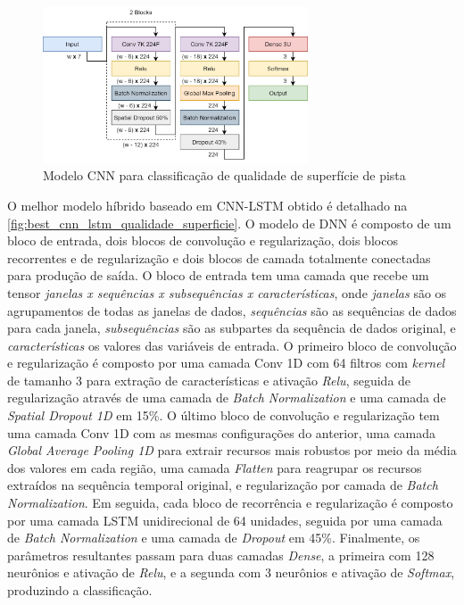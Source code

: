 \begin{figure}[h!]
  \centering
  \caption{Modelo CNN para classificação de qualidade de superfície de pista}
  \label{fig:best_cnn_qualidade_superficie}
  \includegraphics[width=0.7\textwidth]{figuras/fig_48.png}
\end{figure}

O melhor modelo híbrido baseado em CNN-LSTM obtido é detalhado na \autoref{fig:best_cnn_lstm_qualidade_superficie}. O modelo de DNN é composto de um bloco de entrada, dois blocos de convolução e regularização, dois blocos recorrentes e de regularização e dois blocos de camada totalmente conectadas para produção de saída. O bloco de entrada tem uma camada que recebe um tensor \emph{janelas x sequências x subsequências x características}, onde \emph{janelas} são os agrupamentos de todas as janelas de dados, \emph{sequências} são as sequências de dados para cada janela, \emph{subsequências} são as subpartes da sequência de dados original, e \emph{características} os valores das variáveis de entrada. O primeiro bloco de convolução e regularização é composto por uma camada Conv 1D com 64 filtros com \textit{kernel} de tamanho 3 para extração de características e ativação \textit{Relu}, seguida de regularização através de uma camada de \textit{Batch Normalization} e uma camada de \textit{Spatial Dropout 1D} em 15\%. O último bloco de convolução e regularização tem uma camada Conv 1D com as mesmas configurações do anterior, uma camada \textit{Global Average Pooling 1D} para extrair recursos mais robustos por meio da média dos valores em cada região, uma camada \textit{Flatten} para reagrupar os recursos extraídos na sequência temporal original, e regularização por camada de \textit{Batch Normalization}. Em seguida, cada bloco de recorrência e regularização é composto por uma camada LSTM unidirecional de 64 unidades, seguida por uma camada de \textit{Batch Normalization} e uma camada de \textit{Dropout} em 45\%. Finalmente, os parâmetros resultantes passam para duas camadas \textit{Dense}, a primeira com 128 neurônios e ativação de \textit{Relu}, e a segunda com 3 neurônios e ativação de \textit{Softmax}, produzindo a classificação. 

